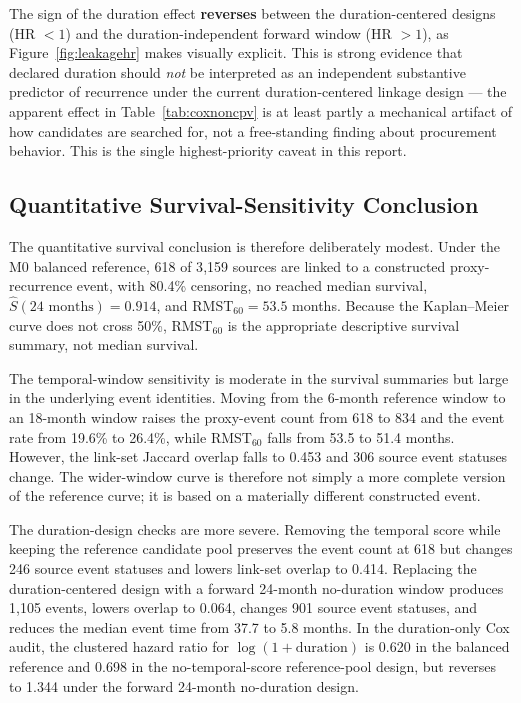 \documentclass[11pt]{article}
\begin{document}
The sign of the duration effect \textbf{reverses} between the
duration-centered designs (HR $<1$) and the duration-independent forward
window (HR $>1$), as Figure~\ref{fig:leakagehr} makes visually explicit.
This is strong evidence that declared duration should
\emph{not} be interpreted as an independent substantive predictor of
recurrence under the current duration-centered linkage design --- the
apparent effect in Table~\ref{tab:coxnoncpv} is at least partly a
mechanical artifact of how candidates are searched for, not a free-standing
finding about procurement behavior. This is the single highest-priority
caveat in this report.

\subsection{Quantitative Survival-Sensitivity Conclusion}
\label{sec:survival-sensitivity-conclusion}
The quantitative survival conclusion is therefore deliberately modest. Under
the M0 balanced reference, 618 of 3{,}159 sources are linked to a constructed
proxy-recurrence event, with 80.4\% censoring, no reached median survival,
$\hat S(24\text{ months})=0.914$, and RMST$_{60}=53.5$ months. Because the
Kaplan--Meier curve does not cross 50\%, RMST$_{60}$ is the appropriate
descriptive survival summary, not median survival.

The temporal-window sensitivity is moderate in the survival summaries but
large in the underlying event identities. Moving from the 6-month reference
window to an 18-month window raises the proxy-event count from 618 to 834
and the event rate from 19.6\% to 26.4\%, while RMST$_{60}$ falls from
53.5 to 51.4 months. However, the link-set Jaccard overlap falls to 0.453
and 306 source event statuses change. The wider-window curve is therefore
not simply a more complete version of the reference curve; it is based on a
materially different constructed event.

The duration-design checks are more severe. Removing the temporal score
while keeping the reference candidate pool preserves the event count at 618
but changes 246 source event statuses and lowers link-set overlap to
0.414. Replacing the duration-centered design with a forward 24-month
no-duration window produces 1{,}105 events, lowers overlap to 0.064,
changes 901 source event statuses, and reduces the median event time from
37.7 to 5.8 months. In the duration-only Cox audit, the clustered hazard
ratio for $\log(1+\text{duration})$ is 0.620 in the balanced reference and
0.698 in the no-temporal-score reference-pool design, but reverses to 1.344
under the forward 24-month no-duration design.
\end{document}
